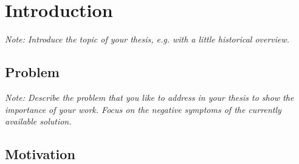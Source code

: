 \documentclass[a4paper,12pt,twoside]{report}
\begin{document}
\setlength{\evensidemargin}{22pt}
\setlength{\oddsidemargin}{22pt}



\lstset{showspaces=false, numbers=left, frame=single, basicstyle=\small}





\newpage
\thispagestyle{empty}
\mbox{}


\newpage
\thispagestyle{empty}
\mbox{}




\clearpage
{}

\clearpage
{}

\tableofcontents
\clearpage

\clearpage



\fancyhead{}
\pagestyle{fancy}
\fancyhead[LE]{\slshape \leftmark}
\fancyhead[RO]{\slshape \rightmark}
\headheight=15pt





\chapter{Introduction}

\textit{Note: Introduce the topic of your thesis, e.g. with a little historical overview.}

\section{Problem}

\textit{Note: Describe the problem that you like to address in your thesis to show the importance of your work. Focus on the negative symptoms of the currently available solution.}

\section{Motivation}
\end{document}
